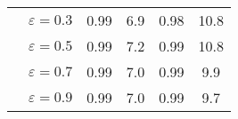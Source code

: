 \begin{table}[t]
\begin{tabular}{cc|cc|cc}
\multicolumn{1}{l|}{}                                                                                           & $\varepsilon = 0.3 $ &   0.99        &       6.9    &     0.98       &    10.8       \\
\multicolumn{1}{l|}{}                                                                                           & $\varepsilon = 0.5 $ &  0.99          &   7.2      &      0.99      &     10.8      \\
\multicolumn{1}{l|}{}                                                                                           & $\varepsilon = 0.7 $ &    0.99       &     7.0      &     0.99    &     9.9      \\
\multicolumn{1}{l|}{}                                                                                           & $\varepsilon = 0.9 $ &   0.99         &  7.0         &      0.99     &      9.7     \\ \hline
\end{tabular}
\end{table}